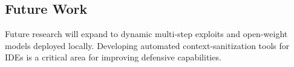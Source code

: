 \subsection{Future Work}
Future research will expand to dynamic multi-step exploits and open-weight models deployed locally. Developing automated context-sanitization tools for IDEs is a critical area for improving defensive capabilities.
